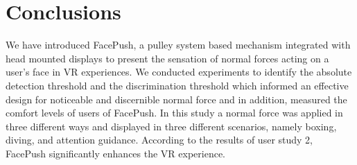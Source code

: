 \chapter{Conclusions } \label{chapter:conclusion}

We have introduced FacePush, a pulley system based mechanism integrated with head mounted displays to present the sensation of normal forces acting on a user's face in VR experiences. We conducted experiments to identify the absolute detection threshold and the discrimination threshold which informed an effective design for noticeable and discernible normal force and in addition, measured the comfort levels of users of FacePush. In this study a normal force was applied in three different ways and displayed in three different scenarios, namely boxing, diving, and attention guidance. According to the results of user study 2, FacePush significantly enhances the VR experience. 